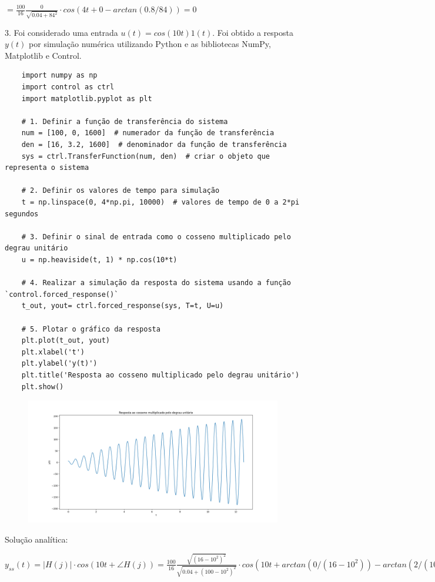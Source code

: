 \documentclass[10pt]{article}
\begin{document}
$= \frac{100}{16} \frac{0}{\sqrt{0.04 + 84^2}} \cdot cos(4 t + 0 - arctan(0.8/84)) = 0$

3. Foi considerado uma entrada $u(t) = cos(10 t) 1(t)$. Foi obtido a resposta $y(t)$ por simulação numérica utilizando Python
e as bibliotecas NumPy, Matplotlib e Control.

\begin{verbatim}
    import numpy as np
    import control as ctrl
    import matplotlib.pyplot as plt

    # 1. Definir a função de transferência do sistema
    num = [100, 0, 1600]  # numerador da função de transferência
    den = [16, 3.2, 1600]  # denominador da função de transferência
    sys = ctrl.TransferFunction(num, den)  # criar o objeto que representa o sistema

    # 2. Definir os valores de tempo para simulação
    t = np.linspace(0, 4*np.pi, 10000)  # valores de tempo de 0 a 2*pi segundos

    # 3. Definir o sinal de entrada como o cosseno multiplicado pelo degrau unitário
    u = np.heaviside(t, 1) * np.cos(10*t)

    # 4. Realizar a simulação da resposta do sistema usando a função `control.forced_response()`
    t_out, yout= ctrl.forced_response(sys, T=t, U=u)

    # 5. Plotar o gráfico da resposta
    plt.plot(t_out, yout)
    plt.xlabel('t')
    plt.ylabel('y(t)')
    plt.title('Resposta ao cosseno multiplicado pelo degrau unitário')
    plt.show()
\end{verbatim}

\begin{figure}[h]
    \includegraphics[scale=0.4]{questao3.png}
    \centering
\end{figure}

Solução analítica:

$y_{ss}(t) = |H(j)| \cdot cos(10 t + \angle H(j)) = \frac{100}{16} \frac{\sqrt{(16-10^2)^2}}{\sqrt{0.04 + (100 - 10^2)^2}} \cdot cos(10 t + arctan(0/(16 - 10^2)) - arctan(2/(100 - 10^2))) =$
\end{document}
